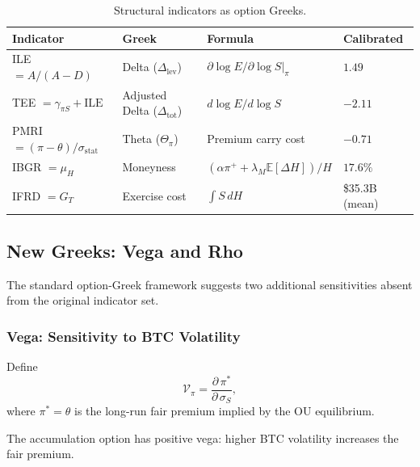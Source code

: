 \begin{table}[ht]
\centering
\caption{Structural indicators as option Greeks.}
\label{tab:greek-map}
\begin{tabular}{@{}llll@{}}
\toprule
\textbf{Indicator} & \textbf{Greek} & \textbf{Formula} & \textbf{Calibrated} \\
\midrule
ILE $= A/(A-D)$ & Delta ($\Delta_{\mathrm{lev}}$)
  & $\partial\log E / \partial\log S\big|_\pi$
  & $1.49$ \\[4pt]
TEE $= \gamma_{\pi S} + \text{ILE}$ & Adjusted Delta ($\Delta_{\mathrm{tot}}$)
  & $d\log E / d\log S$
  & $-2.11$ \\[4pt]
PMRI $= (\pi-\theta)/\sigma_{\mathrm{stat}}$ & Theta ($\Theta_\pi$)
  & Premium carry cost
  & $-0.71$ \\[4pt]
IBGR $= \mu_H$ & Moneyness
  & $(\alpha\pi^+ + \lambda_M\mathbb{E}[\Delta H])/H$
  & $17.6\%$ \\[4pt]
IFRD $= G_T$ & Exercise cost
  & $\int S\,dH$
  & \$35.3B (mean) \\
\bottomrule
\end{tabular}
\end{table}

\subsection{New Greeks: Vega and Rho}\label{ssec:new-greeks}

The standard option-Greek framework suggests two additional sensitivities
absent from the original indicator set.

\subsubsection{Vega: Sensitivity to BTC Volatility}

\begin{definition}\label{def:vega}
Define
$$
  \mathcal{V}_\pi
  = \frac{\partial\,\pi^*}{\partial\,\sigma_S},
$$
where $\pi^* = \theta$ is the long-run fair premium implied by the OU
equilibrium.
\end{definition}

\begin{proposition}\label{prop:vega}
The accumulation option has positive vega: higher BTC volatility increases
the fair premium.
\end{proposition}

